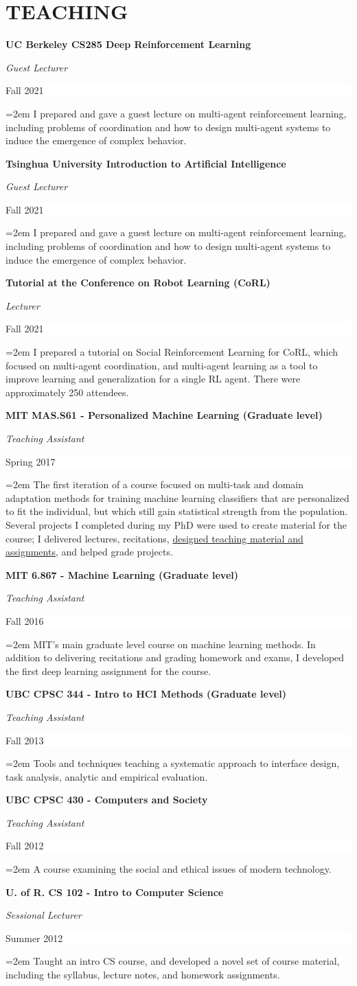 \documentclass[paper=letter,fontsize=11pt]{scrartcl} %
\newcommand{\sepspace}{\vspace*{1em}}       %
\newcommand{\NewPart}[2]{\section*{\uppercase{#1} #2}}
\newcommand{\CourseEntry}[4]{
        \noindent \textbf{#1} \par
        \noindent \textit{#3} \hfill      %
        \colorbox{White}{%
            \parbox{6em}{%
            \hfill\color{Black}#2}} \par  %
        \noindent\hangindent=2em\hangafter=0 \small #4 %
        \normalsize \par}
\begin{document}
\NewPart{Teaching}{}
\CourseEntry{UC Berkeley CS285 Deep Reinforcement Learning}{Fall 2021}{Guest Lecturer}
{I prepared and gave a guest lecture on multi-agent reinforcement learning, including problems of coordination and how to design multi-agent systems to induce the emergence of complex behavior.}
\sepspace

\CourseEntry{Tsinghua University Introduction to Artificial Intelligence}{Fall 2021}{Guest Lecturer}
{I prepared and gave a guest lecture on multi-agent reinforcement learning, including problems of coordination and how to design multi-agent systems to induce the emergence of complex behavior.}
\sepspace

\CourseEntry{Tutorial at the Conference on Robot Learning (CoRL)}{Fall 2021}{Lecturer}
{I prepared a tutorial on Social Reinforcement Learning for CoRL, which focused on multi-agent coordination, and multi-agent learning as a tool to improve learning and generalization for a single RL agent. There were approximately 250 attendees.}
\sepspace

\CourseEntry{MIT MAS.S61 - Personalized Machine Learning (Graduate level)}{Spring 2017}{Teaching Assistant}
{The first iteration of a course focused on multi-task and domain adaptation methods for training machine learning classifiers that are personalized to fit the individual, but which still gain statistical strength from the population. Several projects I completed during my PhD were used to create material for the course; I delivered lectures, recitations, \href{https://github.com/natashamjaques/PersonalizedML}{designed teaching material and assignments}, and helped grade projects.}
\sepspace

\CourseEntry{MIT 6.867 - Machine Learning (Graduate level)}{Fall 2016}{Teaching Assistant}
{MIT's main graduate level course on machine learning methods. In addition to delivering recitations and grading homework and exams, I developed the first deep learning assignment for the course.}
\sepspace

\CourseEntry{UBC CPSC 344 - Intro to HCI Methods (Graduate level)}{Fall 2013}{Teaching Assistant}
{Tools and techniques teaching a systematic approach to interface design, task analysis, analytic and empirical evaluation.}
\sepspace

\CourseEntry{UBC CPSC 430 - Computers and Society}{Fall 2012}{Teaching Assistant}
{A course examining the social and ethical issues of modern technology.}
\sepspace

\CourseEntry{U. of R. CS 102 - Intro to Computer Science}{Summer 2012}{Sessional Lecturer}
{Taught an intro CS course, and developed a novel set of course material, including the syllabus, lecture notes, and homework assignments.}
\sepspace
\end{document}
